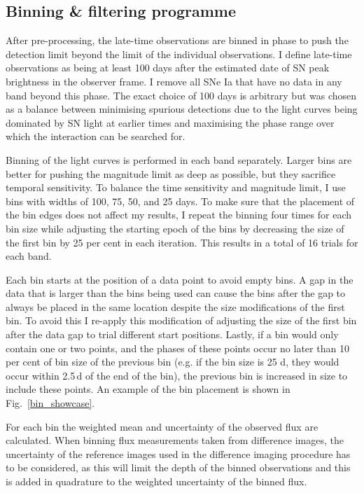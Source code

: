 \documentclass[a4paper,oneside,12pt, class=Latex/Classes/PhDthesisPSnPDF, crop=false]{standalone}
\begin{document}
\subsection{Binning \& filtering programme}
\label{pipeline}
After pre-processing, the late-time observations are binned in phase to push the detection limit beyond the limit of the individual observations. I define late-time observations as being at least 100 days after the estimated date of SN peak brightness in the observer frame. I remove all SNe Ia that have no data in any band beyond this phase. The exact choice of 100 days is arbitrary but was chosen as a balance between minimising spurious detections due to the light curves being dominated by SN light at earlier times and maximising the phase range over which the interaction can be searched for. 

Binning of the light curves is performed in each band separately. Larger bins are better for pushing the magnitude limit as deep as possible, but they sacrifice temporal sensitivity. To balance the time sensitivity and magnitude limit, I use bins with widths of 100, 75, 50, and 25 days. To make sure that the placement of the bin edges does not affect my results, I repeat the binning four times for each bin size while adjusting the starting epoch of the bins by decreasing the size of the first bin by 25 per cent in each iteration. This results in a total of 16 trials for each band.

Each bin starts at the position of a data point to avoid empty bins. A gap in the data that is larger than the bins being used can cause the bins after the gap to always be placed in the same location despite the size modifications of the first bin. To avoid this I re-apply this modification of adjusting the size of the first bin after the data gap to trial different start positions. Lastly, if a bin would only contain one or two points, and the phases of these points occur no later than 10 per cent of bin size of the previous bin (e.g. if the bin size is 25 d, they would occur within 2.5\,d of the end of the bin), the previous bin is increased in size to include these points. An example of the bin placement is shown in Fig.~\ref{bin_showcase}.

For each bin the weighted mean and uncertainty of the observed flux are calculated. When binning flux measurements taken from difference images, the uncertainty of the reference images used in the difference imaging procedure has to be considered, as this will limit the depth of the binned observations \citep{ref_uncert} and this is added in quadrature to the weighted uncertainty of the binned flux. 
\end{document}
